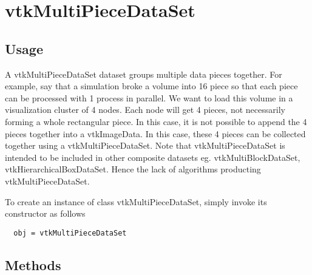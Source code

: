 \section{vtkMultiPieceDataSet}

\subsection{Usage}

 A vtkMultiPieceDataSet dataset groups multiple data pieces together. 
 For example, say that a simulation broke a volume into 16 piece so that 
 each piece can be processed with 1 process in parallel. We want to load 
 this volume in a visualization cluster of 4 nodes. Each node will get 4 
 pieces, not necessarily forming a whole rectangular piece. In this case, 
 it is not possible to append the 4 pieces together into a vtkImageData. 
 In this case, these 4 pieces can be collected together using a 
 vtkMultiPieceDataSet. 
 Note that vtkMultiPieceDataSet is intended to be included in other composite
 datasets eg. vtkMultiBlockDataSet, vtkHierarchicalBoxDataSet. Hence the lack
 of algorithms producting vtkMultiPieceDataSet.

To create an instance of class vtkMultiPieceDataSet, simply
invoke its constructor as follows
\begin{verbatim}
  obj = vtkMultiPieceDataSet
\end{verbatim}
\subsection{Methods}

